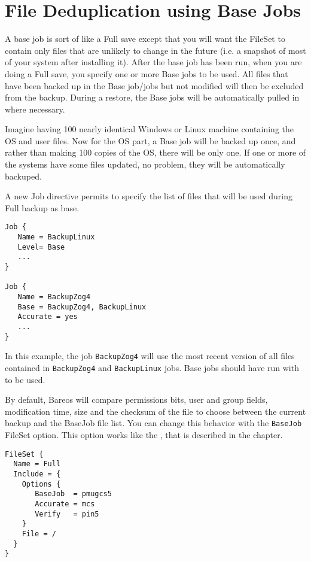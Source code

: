 \chapter{File Deduplication using Base Jobs}
\label{basejobs}
A base job is sort of like a Full save except that you will want the FileSet to
contain only files that are unlikely to change in the future (i.e.  a snapshot
of most of your system after installing it).  After the base job has been run,
when you are doing a Full save, you specify one or more Base jobs to be used.
All files that have been backed up in the Base job/jobs but not modified will
then be excluded from the backup.  During a restore, the Base jobs will be
automatically pulled in where necessary.

Imagine having 100
nearly identical Windows or Linux machine containing the OS and user files.
Now for the OS part, a Base job will be backed up once, and rather than making
100 copies of the OS, there will be only one.  If one or more of the systems
have some files updated, no problem, they will be automatically backuped.

A new Job directive  permits to specify the list of
files that will be used during Full backup as base.

\begin{verbatim}
Job {
   Name = BackupLinux
   Level= Base
   ...
}

Job {
   Name = BackupZog4
   Base = BackupZog4, BackupLinux
   Accurate = yes
   ...
}
\end{verbatim}

In this example, the job \texttt{BackupZog4} will use the most recent version
of all files contained in \texttt{BackupZog4} and \texttt{BackupLinux}
jobs. Base jobs should have run with  to be used.

By default, Bareos will compare permissions bits, user and group fields,
modification time, size and the checksum of the file to choose between the
current backup and the BaseJob file list. You can change this behavior with the
\texttt{BaseJob} FileSet option. This option works like the , that is described in the  chapter.

\begin{verbatim}
FileSet {
  Name = Full
  Include = {
    Options {
       BaseJob  = pmugcs5
       Accurate = mcs
       Verify   = pin5
    }
    File = /
  }
}
\end{verbatim}

